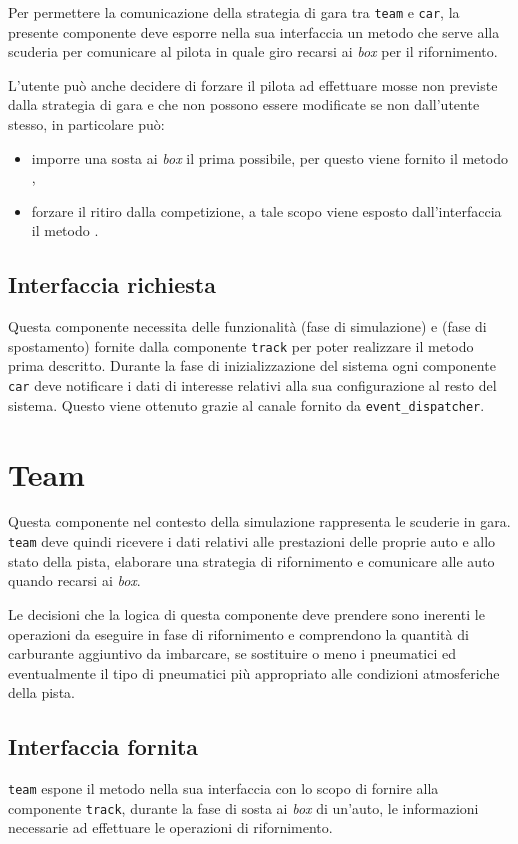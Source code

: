 Per permettere la comunicazione della strategia di gara tra \texttt{team} e \texttt{car}, la presente componente deve esporre nella sua interfaccia un metodo  che serve alla scuderia per comunicare al pilota in quale giro recarsi ai \textit{box} per il rifornimento.

L'utente può anche decidere di forzare il pilota ad effettuare mosse non previste dalla strategia di gara e che non possono essere modificate se non dall'utente stesso, in particolare può:
\begin{itemize}
\item imporre una sosta ai \textit{box} il prima possibile, per questo viene fornito il metodo ,
\item forzare il ritiro dalla competizione, a tale scopo viene esposto dall'interfaccia il metodo .
\end{itemize}

\subsection*{Interfaccia richiesta}
Questa componente necessita delle funzionalità  (fase di simulazione) e  (fase di spostamento) fornite dalla componente \texttt{track} per poter realizzare il metodo  prima descritto.
Durante la fase di inizializzazione del sistema ogni componente \texttt{car} deve notificare i dati di interesse relativi alla sua configurazione al resto del sistema. Questo viene ottenuto grazie al canale  fornito da \texttt{event\_dispatcher}.

\section{Team}
Questa componente nel contesto della simulazione rappresenta le scuderie in gara. \texttt{team} deve quindi ricevere i dati relativi alle prestazioni delle proprie auto e allo stato della pista, elaborare una strategia di rifornimento e comunicare alle auto quando recarsi ai \textit{box}.

Le decisioni che la logica di questa componente deve prendere sono inerenti le operazioni da eseguire in fase di rifornimento e comprendono la quantità di carburante aggiuntivo da imbarcare, se sostituire o meno i pneumatici ed eventualmente il tipo di pneumatici più appropriato alle condizioni atmosferiche della pista.

\subsection*{Interfaccia fornita}
\texttt{team} espone il metodo  nella sua interfaccia con lo scopo di fornire alla componente \texttt{track}, durante la fase di sosta ai \textit{box} di un'auto, le informazioni necessarie ad effettuare le operazioni di rifornimento.

